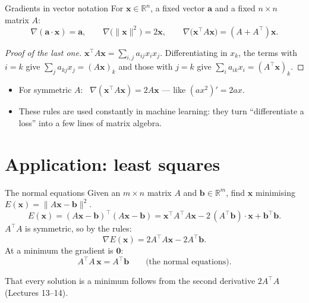 \documentclass[10pt]{wosm-slides}
\newcommand{\R}{\mathbb{R}}
\newcommand{\norm}[1]{\lVert #1 \rVert}
\newcommand{\vx}{\mathbf{x}}
\newcommand{\va}{\mathbf{a}}
\newcommand{\vb}{\mathbf{b}}
\begin{document}
\begin{frame}{Gradients in vector notation}
  For $\vx \in \R^n$, a fixed vector $\va$ and a fixed $n \times n$ matrix $A$:
  \[ \nabla(\va \cdot \vx) = \va, \qquad
     \nabla\bigl(\norm{\vx}^2\bigr) = 2\vx, \qquad
     \nabla\bigl(\vx^\top A \vx\bigr) = (A + A^\top)\vx . \]
  \pause
  \begin{proof}[Proof of the last one]
    $\vx^\top A \vx = \sum_{i,j} a_{ij} x_i x_j$. Differentiating in $x_k$, the terms with $i = k$ give
    $\sum_j a_{kj} x_j = (A\vx)_k$ and those with $j = k$ give $\sum_i a_{ik} x_i = (A^\top \vx)_k$.
  \end{proof}
  \pause
  \begin{itemize}
    \item For symmetric $A$: \ $\nabla(\vx^\top A \vx) = 2A\vx$ --- like $(a x^2)' = 2ax$.
    \item These rules are used constantly in machine learning: they turn ``differentiate a loss''
      into a few lines of matrix algebra.
  \end{itemize}
\end{frame}

\section{Application: least squares}

\begin{frame}{The normal equations}
  Given an $m \times n$ matrix $A$ and $\vb \in \R^m$, find $\vx$ minimising
  $E(\vx) = \norm{A\vx - \vb}^2$.
  \pause
  \[ E(\vx) = (A\vx - \vb)^\top (A\vx - \vb)
     = \vx^\top A^\top A \vx - 2\, (A^\top \vb) \cdot \vx + \vb^\top \vb . \]
  \pause
  $A^\top A$ is symmetric, so by the rules:
  \[ \nabla E(\vx) = 2A^\top A \vx - 2A^\top \vb . \]
  \pause
  At a minimum the gradient is $\mathbf 0$:
  \[ A^\top A\, \vx = A^\top \vb \qquad \text{(the normal equations).} \]
  {\small That every solution is a minimum follows from the second derivative $2A^\top A$
  (Lectures 13--14).\par}
\end{frame}

\end{document}
